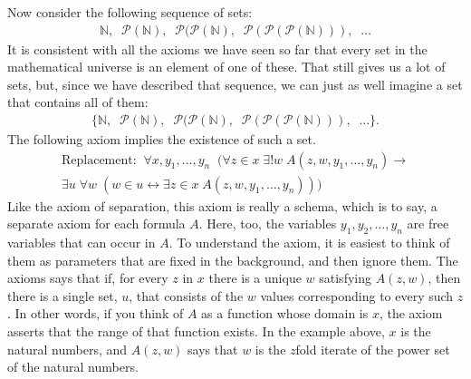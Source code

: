 \documentclass[letterpaper,10pt,english]{sphinxmanual}
\begin{document}
\sphinxAtStartPar
Now consider the following sequence of sets:
\begin{equation*}
\begin{split}\mathbb{N}, \;\; \mathcal P(\mathbb{N}), \;\; \mathcal P(\mathcal P(\mathbb{N}), \;\; \mathcal P (\mathcal P (\mathcal P (\mathbb{N}))), \;\; \ldots\end{split}
\end{equation*}
\sphinxAtStartPar
It is consistent with all the axioms we have seen so far that every set in the mathematical universe is an element of one of these. That still gives us a lot of sets, but, since we have described that sequence, we can just as well imagine a set that contains all of them:
\begin{equation*}
\begin{split}\{ \mathbb{N}, \;\; \mathcal P(\mathbb{N}), \;\; \mathcal P(\mathcal P(\mathbb{N}), \;\; \mathcal P (\mathcal P (\mathcal P (\mathbb{N}))), \;\; \ldots \}.\end{split}
\end{equation*}
\sphinxAtStartPar
The following axiom implies the existence of such a set.
\begin{equation*}
\begin{split}\text{Replacement:} \;\; \forall x, y_1, \ldots, y_n \;\; (\forall z \in x \; \exists ! w \; A(z, w, y_1, \ldots, y_n) \rightarrow \\
\exists u \; \forall w \; (w \in u \leftrightarrow \exists z \in x \; A(z, w, y_1, \ldots, y_n)))\end{split}
\end{equation*}
\sphinxAtStartPar
Like the axiom of separation, this axiom is really a schema, which is to say, a separate axiom for each formula \(A\). Here, too, the variables \(y_1, y_2, \ldots, y_n\) are free variables that can occur in \(A\). To understand the axiom, it is easiest to think of them as parameters that are fixed in the background, and then ignore them. The axioms says that if, for every \(z\) in \(x\) there is a unique \(w\) satisfying \(A(z,w)\), then there is a single set, \(u\), that consists of the \(w\) values corresponding to every such \(z\). In other words, if you think of \(A\) as a function whose domain is \(x\), the axiom asserts that the range of that function exists. In the example above, \(x\) is the natural numbers, and \(A(z, w)\) says that \(w\) is the \(z\)\sphinxhyphen{}fold iterate of the power set of the natural numbers.
\end{document}
